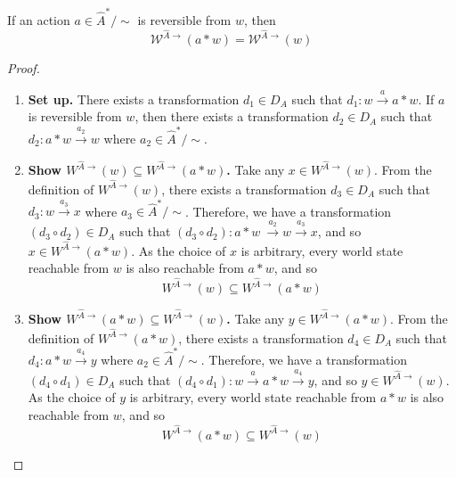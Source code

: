 \begin{proposition}
\label{prp:reachable_subworld_reversible_action}
    If an action $a \in \hat{A}^{*}/\sim$ is reversible from $w$, then
    \begin{equation}
        \mathscr{W}^{\hat{A}\to}(a \ast w) = \mathscr{W}^{\hat{A}\to}(w)
    \end{equation}
\end{proposition}
\begin{proof}
\begin{enumerate}[(1)]
    \item \textbf{Set up.}
    There exists a transformation $d_{1} \in D_{A}$ such that $d_{1}: w \xrightarrow{a} a \ast w$.
    If $a$ is reversible from $w$, then there exists a transformation $d_{2} \in D_{A}$ such that $d_{2}: a \ast w \xrightarrow{a_{2}} w$ where $a_{2} \in \hat{A}^{*}/\sim$.
    
    \item \textbf{Show $W^{\hat{A}\to}(w) \subseteq W^{\hat{A}\to}(a \ast w)$.}
    Take any $x \in W^{\hat{A}\to}(w)$.
    From the definition of $W^{\hat{A}\to}(w)$, there exists a transformation $d_{3} \in D_{A}$ such that $d_{3}: w \xrightarrow{a_{3}} x$ where $a_{3} \in \hat{A}^{*}/\sim$.
    Therefore, we have a transformation $(d_{3} \circ d_{2}) \in D_{A}$ such that $(d_{3} \circ d_{2}): a \ast w \ \xrightarrow{a_{2}} w \xrightarrow{a_{3}} x$, and so $x \in W^{\hat{A}\to}(a \ast w)$.
    As the choice of $x$ is arbitrary, every world state reachable from $w$ is also reachable from $a \ast w$, and so
    \begin{equation}
        W^{\hat{A}\to}(w) \subseteq W^{\hat{A}\to}(a \ast w)
        \label{eqn:reachable_subworld_w_subset_reachable_subworld_result_reversible}
    \end{equation}

    \item \textbf{Show $W^{\hat{A}\to}(a \ast w) \subseteq W^{\hat{A}\to}(w)$.}
    Take any $y \in W^{\hat{A}\to}(a \ast w)$.
    From the definition of $W^{\hat{A}\to}(a \ast w)$, there exists a transformation $d_{4} \in D_{A}$ such that $d_{4}: a \ast w \xrightarrow{a_{4}} y$ where $a_{2} \in \hat{A}^{*}/\sim$.
    Therefore, we have a transformation $(d_{4} \circ d_{1}) \in D_{A}$ such that $(d_{4} \circ d_{1}): w \xrightarrow{a} a \ast w \xrightarrow{a_{4}} y$, and so $y \in W^{\hat{A}\to}(w)$.
    As the choice of $y$ is arbitrary, every world state reachable from $a \ast w$ is also reachable from $w$, and so
    \begin{equation}
        W^{\hat{A}\to}(a \ast w) \subseteq W^{\hat{A}\to}(w)
        \label{eqn:reachable_subworld_result_subset_reachable_subworld_w_reversible}
    \end{equation}


\end{enumerate}
\end{proof}
